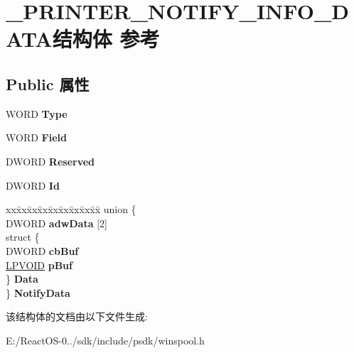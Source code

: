 \hypertarget{struct___p_r_i_n_t_e_r___n_o_t_i_f_y___i_n_f_o___d_a_t_a}{}\section{\+\_\+\+P\+R\+I\+N\+T\+E\+R\+\_\+\+N\+O\+T\+I\+F\+Y\+\_\+\+I\+N\+F\+O\+\_\+\+D\+A\+T\+A结构体 参考}
\label{struct___p_r_i_n_t_e_r___n_o_t_i_f_y___i_n_f_o___d_a_t_a}
\subsection*{Public 属性}
\begin{DoxyCompactItemize}
\item 
\mbox{\label{struct___p_r_i_n_t_e_r___n_o_t_i_f_y___i_n_f_o___d_a_t_a_a6d8afd9bb17daca540985781a14e828c}} 
W\+O\+RD {\bfseries Type}
\item 
\mbox{\label{struct___p_r_i_n_t_e_r___n_o_t_i_f_y___i_n_f_o___d_a_t_a_afcc812e74bd027c610b31d7066da66f6}} 
W\+O\+RD {\bfseries Field}
\item 
\mbox{\label{struct___p_r_i_n_t_e_r___n_o_t_i_f_y___i_n_f_o___d_a_t_a_a331cc061badb8d38576f8b7e9ad1d00c}} 
D\+W\+O\+RD {\bfseries Reserved}
\item 
\mbox{\label{struct___p_r_i_n_t_e_r___n_o_t_i_f_y___i_n_f_o___d_a_t_a_ae443fbbd2e351aadf44018cf103e899b}} 
D\+W\+O\+RD {\bfseries Id}
\item 
\mbox{\label{struct___p_r_i_n_t_e_r___n_o_t_i_f_y___i_n_f_o___d_a_t_a_a88616a7354f10c9980c9db7d3e392a25}} 
\begin{tabbing}
xx\=xx\=xx\=xx\=xx\=xx\=xx\=xx\=xx\=\kill
union \{\\
\>DWORD {\bfseries adwData} \mbox{[}2\mbox{]}\\
\>struct \{\\
\>\>DWORD {\bfseries cbBuf}\\
\>\>\hyperlink{interfacevoid}{LPVOID} {\bfseries pBuf}\\
\>\} {\bfseries Data}\\
\} {\bfseries NotifyData}\\

\end{tabbing}\end{DoxyCompactItemize}


该结构体的文档由以下文件生成\+:\begin{DoxyCompactItemize}
\item 
E\+:/\+React\+O\+S-\/0../sdk/include/psdk/winspool.\+h\end{DoxyCompactItemize}
